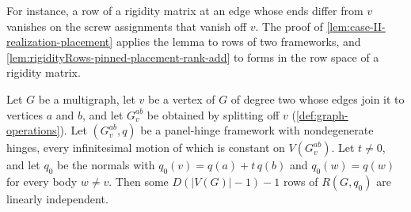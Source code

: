 For instance, a row of a rigidity matrix at an edge whose ends differ
from $v$ vanishes on the screw assignments that vanish off $v$. The
proof of \cref{lem:case-II-realization-placement} applies the lemma to
rows of two frameworks, and
\cref{lem:rigidityRows-pinned-placement-rank-add} to forms in the row
space of a rigidity matrix.

\begin{lemma}
  \label{lem:case-II-realization-placement}
  \leanok
  Let $G$ be a multigraph, let $v$ be a vertex of $G$ of degree two whose
  edges join it to vertices $a$ and $b$, and let $G_v^{ab}$ be obtained by
  splitting off $v$ (\cref{def:graph-operations}). Let $(G_v^{ab}, q)$ be
  a panel-hinge framework with nondegenerate hinges, every infinitesimal
  motion of which is constant on $V(G_v^{ab})$. Let $t \neq 0$, and let
  $q_0$ be the normals with $q_0(v) = q(a) + t\,q(b)$ and
  $q_0(w) = q(w)$ for every body $w \neq v$. Then some
  $D(|V(G)| - 1) - 1$ rows of $R(G, q_0)$ are linearly independent.
\end{lemma}
